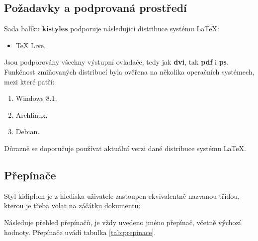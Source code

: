 \documentclass[
  biblatex,
  glossaries,
  index
]{kidiplom}
\begin{document}
\subsection{Požadavky a podprovaná prostředí}
Sada balíku \textbf{kistyles} podporuje následující distribuce systému \LaTeX{}:
\begin{itemize}
  \item \TeX{} Live.
\end{itemize}

Jsou podporovány všechny výstupní ovladače, tedy jak \textbf{dvi}, tak \textbf{pdf} i \textbf{ps}. Funkčnost zmiňovaných distribucí byla ověřena na několika operačních systémech, mezi které patří:
\begin{enumerate}
  \item Windows $8.1$,
  \item Archlinux,
  \item Debian.
\end{enumerate}

Důrazně se doporučuje používat aktuální verzi dané distribuce systému \LaTeX{}.


\subsection{Přepínače}
Styl kidiplom je z hlediska uživatele zastoupen ekvivalentně nazvanou třídou, kterou je třeba volat na záčátku dokumentu:

Následuje přehled přepínačů, je vždy uvedeno jméno přepínač, včetně výchozí hodnoty. Přepínače uvádí tabulka \ref{tab:prepinace}.
\end{document}
